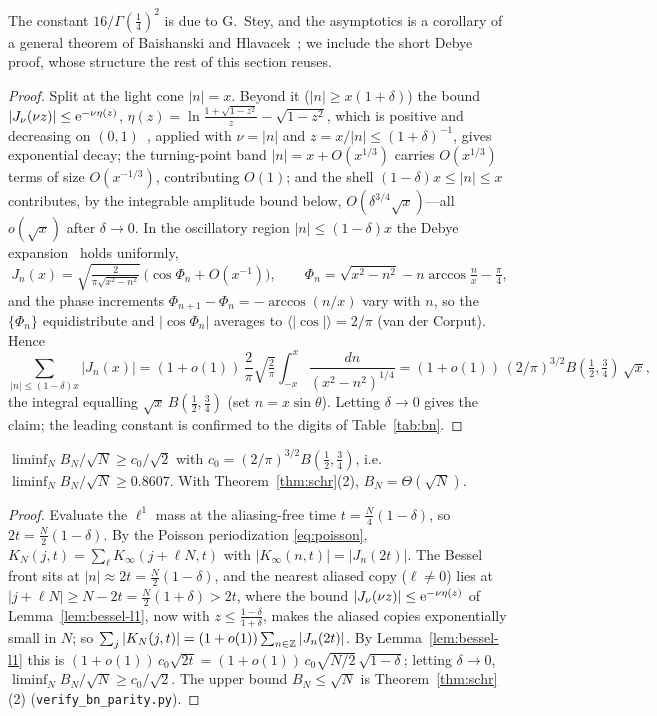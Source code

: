 \noindent The constant $16/\Gamma(\tfrac14)^2$ is due to G.~Stey, and the asymptotics is a corollary of a general
theorem of Baishanski and Hlavacek~\cite[Cor.~1]{BH08}; we include the short Debye proof, whose
structure the rest of this section reuses.

\begin{proof}
Split at the light cone $|n|=x$. Beyond it ($|n|\ge x(1+\delta)$) the bound
$|J_\nu(\nu z)|\le\mathrm{e}^{-\nu\eta(z)}$, $\eta(z)=\ln\frac{1+\sqrt{1-z^2}}z-\sqrt{1-z^2}$, which is positive and
decreasing on $(0,1)$~\cite[10.14.5]{DLMF}, applied with $\nu=|n|$ and $z=x/|n|\le(1+\delta)^{-1}$, gives
exponential decay; the turning-point band $|n|=x+O(x^{1/3})$ carries $O(x^{1/3})$ terms of
size $O(x^{-1/3})$, contributing $O(1)$; and the shell $(1-\delta)x\le|n|\le x$ contributes, by the
integrable amplitude bound below, $O(\delta^{3/4}\sqrt x)$---all $o(\sqrt x)$ after $\delta\to0$. In the
oscillatory region $|n|\le(1-\delta)x$ the Debye expansion~\cite{Watson} holds uniformly,
\[
  J_n(x)=\sqrt{\tfrac{2}{\pi\sqrt{x^2-n^2}}}\,\bigl(\cos\Phi_n+O(x^{-1})\bigr),\qquad
  \Phi_n=\sqrt{x^2-n^2}-n\arccos\tfrac nx-\tfrac\pi4 ,
\]
and the phase increments $\Phi_{n+1}-\Phi_n=-\arccos(n/x)$ vary with $n$, so the $\{\Phi_n\}$
equidistribute and $|\cos\Phi_n|$ averages to $\langle|\cos|\rangle=2/\pi$ (van der Corput). Hence
\[
  \sum_{|n|\le(1-\delta)x}|J_n(x)|=(1+o(1))\,\frac2\pi\sqrt{\tfrac2\pi}\int_{-x}^{x}\frac{dn}{(x^2-n^2)^{1/4}}
  =(1+o(1))\,(2/\pi)^{3/2}B(\tfrac12,\tfrac34)\,\sqrt x ,
\]
the integral equalling $\sqrt x\,B(\tfrac12,\tfrac34)$ (set $n=x\sin\theta$). Letting $\delta\to0$ gives the
claim; the leading constant is confirmed to the digits of Table~\ref{tab:bn}.
\end{proof}

\begin{theorem}\label{thm:schr-lower}
$\liminf_N B_N/\sqrt N\ge c_0/\sqrt2$ with $c_0=(2/\pi)^{3/2}B(\tfrac12,\tfrac34)$, i.e.\
$\liminf_N B_N/\sqrt N\ge0.8607$. With Theorem~\ref{thm:schr}(2), $B_N=\Theta(\sqrt N)$.
\end{theorem}

\begin{proof}
Evaluate the $\ell^1$ mass at the aliasing-free time $t=\tfrac N4(1-\delta)$, so $2t=\tfrac N2(1-\delta)$.
By the Poisson periodization \eqref{eq:poisson}, $K_N(j,t)=\sum_{\ell}K_\infty(j+\ell N,t)$ with
$|K_\infty(n,t)|=|J_n(2t)|$. The Bessel front sits at $|n|\approx2t=\tfrac N2(1-\delta)$, and the nearest
aliased copy ($\ell\ne0$) lies at $|j+\ell N|\ge N-2t=\tfrac N2(1+\delta)>2t$, where the bound
$|J_\nu(\nu z)|\le\mathrm{e}^{-\nu\eta(z)}$ of Lemma~\ref{lem:bessel-l1}, now with $z\le\frac{1-\delta}{1+\delta}$, makes the
aliased copies exponentially small in $N$; so
$\sum_{j}|K_N(j,t)|=(1+o(1))\sum_{n\in\mathbb{Z}}|J_n(2t)|$. By Lemma~\ref{lem:bessel-l1} this is
$(1+o(1))\,c_0\sqrt{2t}=(1+o(1))\,c_0\sqrt{N/2}\,\sqrt{1-\delta}$; letting $\delta\to0$,
$\liminf_N B_N/\sqrt N\ge c_0/\sqrt2$. The upper bound $B_N\le\sqrt N$ is Theorem~\ref{thm:schr}(2)
(\texttt{verify\_bn\_parity.py}). \end{proof}

